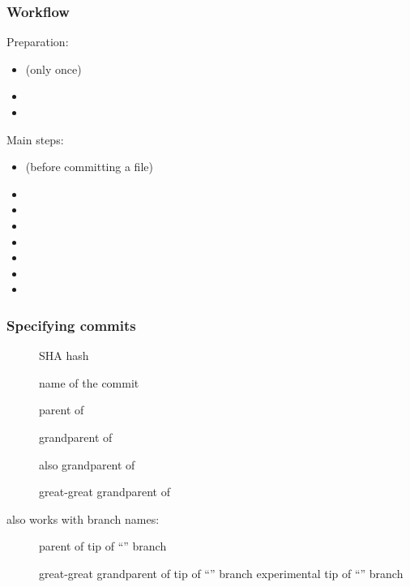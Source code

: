 \begin{frame}
\frametitle{Workﬂow}

Preparation:
\begin{itemize}
    \item {} (only once)
    \item {}
    \item {}
\end{itemize}

Main steps:
\begin{itemize}
    \item {} (before committing a file)
    \item {}
    \item {}
    \item {}
    \item {}
    \item {}
    \item {}
    \item {}
\end{itemize}
\end{frame}

\begin{frame}
\frametitle{Specifying commits}
\begin{description}
    \item[] SHA hash
    \item[] name of the commit
    \item[] parent of 
    \item[] grandparent of 
    \item[] also grandparent of 
    \item[] great-great grandparent of 
\end{description}

also works with branch names:
\begin{description}
    \item[] parent of tip of “” branch
    \item[] great-great grandparent of tip of “” branch
        experimental tip of “” branch
\end{description}
\end{frame}

